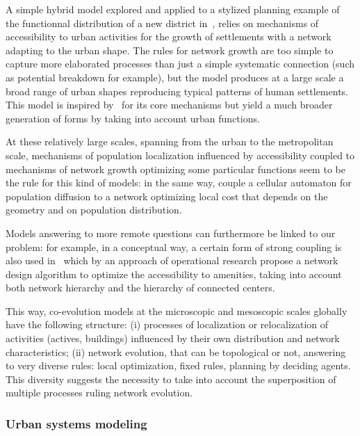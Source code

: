 \documentclass[galley]{jtlu-article-2col}
\begin{document}
A simple hybrid model explored and applied to a stylized planning example of the functionnal distribution of a new district in~\cite{raimbault2014hybrid}, relies on mechanisms of accessibility to urban activities for the growth of settlements with a network adapting to the urban shape. The rules for network growth are too simple to capture more elaborated processes than just a simple systematic connection (such as potential breakdown for example), but the model produces at a large scale a broad range of urban shapes reproducing typical patterns of human settlements. This model is inspired by~\cite{moreno2012automate} for its core mechanisms but yield a much broader generation of forms by taking into account urban functions.

At these relatively large scales, spanning from the urban to the metropolitan scale, mechanisms of population localization influenced by accessibility coupled to mechanisms of network growth optimizing some particular functions seem to be the rule for this kind of models: in the same way, \cite{wu2017city} couple a cellular automaton for population diffusion to a network optimizing local cost that depends on the geometry and on population distribution.

Models answering to more remote questions can furthermore be linked to our problem: for example, in a conceptual way, a certain form of strong coupling is also used in~\cite{bigotte2010integrated} which by an approach of operational research propose a network design algorithm to optimize the accessibility to amenities, taking into account both network hierarchy and the hierarchy of connected centers.


This way, co-evolution models at the microscopic and mesoscopic scales globally have the following structure: (i) processes of localization or relocalization of activities (actives, buildings) influenced by their own distribution and network characteristics; (ii) network evolution, that can be topological or not, answering to very diverse rules: local optimization, fixed rules, planning by deciding agents. This diversity suggests the necessity to take into account the superposition of multiple processes ruling network evolution.

\subsubsection{Urban systems modeling}
\end{document}
